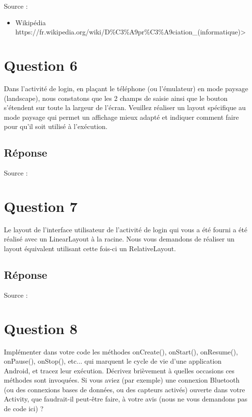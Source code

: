 \documentclass[francais,12pt]{article}
\begin{document}
		Source :
		\begin{itemize}
			\item Wikipédia \newline https://fr.wikipedia.org/wiki/D\%C3\%A9pr\%C3\%A9ciation\_(informatique)>
		\end{itemize}
	
		
	\section*{Question 6}
		Dans l’activité de login, en plaçant le téléphone (ou l’émulateur) en mode paysage (landscape), nous constatons que les 2 champs de saisie ainsi que le bouton s’étendent sur toute la largeur de l’écran. Veuillez réaliser un layout spécifique au mode paysage qui permet un affichage mieux adapté et indiquer comment faire pour qu’il soit utilisé à l’exécution.  
		
		\subsection*{Réponse}
		
		Source :
		
	\section*{Question 7}
		Le layout de l’interface utilisateur de l’activité de login qui vous a été fourni a été réalisé avec un LinearLayout à la racine. Nous vous demandons de réaliser un layout équivalent utilisant cette fois-ci un RelativeLayout.  
		
		\subsection*{Réponse}
		
		Source :
		
	\section*{Question 8}
		Implémenter dans votre code les méthodes onCreate(), onStart(), onResume(), onPause(), onStop(), etc... qui marquent le cycle de vie d'une application Android, et tracez leur exécution. Décrivez brièvement à quelles occasions ces méthodes sont invoquées. Si vous aviez (par exemple) une connexion Bluetooth (ou des connexions bases de données, ou des capteurs activés) ouverte dans votre Activity, que faudrait-il peut-être faire, à votre avis (nous ne vous demandons pas de code ici) ? 
		
\end{document}
